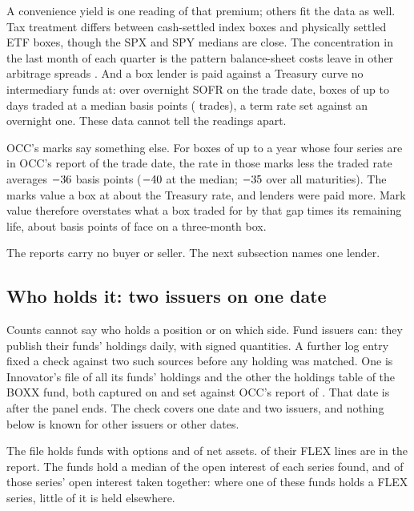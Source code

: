 \documentclass[11pt]{article}
\begin{document}
A convenience yield is one reading of that premium; others fit the data as well. Tax treatment differs between cash-settled index boxes and
physically settled ETF boxes, though the SPX and SPY medians are close. The concentration
in the last month of each quarter is the pattern balance-sheet costs leave in other
arbitrage spreads \citep{du2018}. And a box lender is paid against a Treasury curve no
intermediary funds at: over overnight SOFR on the trade date, boxes of up to
\BoxRSofrMaxDays{} days traded at a median \BoxRSofrMedian{} basis points
(\BoxRSofrTrades{} trades), a term rate set against an overnight one. These data cannot
tell the readings apart.

OCC's marks say something else. For boxes of up to a year whose four series are in OCC's
report of the trade date, the rate in those marks less the traded rate averages
$-36$ basis points ($-40$ at the median;
$-35$ over all maturities). The marks value a box at about the Treasury rate,
and lenders were paid more. Mark value therefore overstates what a box traded for by
that gap times its remaining life, about \BoxRMarkThreeMonth{} basis points of face on a
three-month box.

The reports carry no buyer or seller. The next subsection names one lender.

\subsection{Who holds it: two issuers on one date}
\label{sec:holders}

Counts cannot say who holds a position or on which side. Fund issuers can: they publish
their funds' holdings daily, with signed quantities. A further log entry fixed a check
against two such sources before any holding was matched. One is Innovator's file of all
its funds' holdings and the other the holdings table of the BOXX fund, both captured on
\HoldFileDate{} and set against OCC's report of \HoldReportDate{}. That date is after the
panel ends. The check covers one date and two issuers, and nothing below is known for
other issuers or other dates.

The file holds \HoldFunds{} funds with options and \HoldNetAssets{} of net assets.
\HoldFoundLines{} of their \HoldLines{} FLEX lines are in the report. The funds hold a
median \HoldMedianShare{} of the open interest of each series found, and \HoldHeldShare{}
of those series' open interest taken together: where one of these funds holds a FLEX
series, little of it is held elsewhere.
\end{document}
